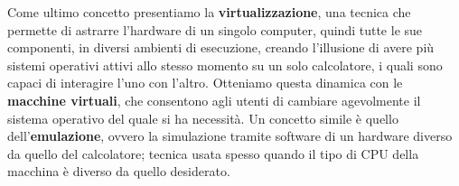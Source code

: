 \noindent Come ultimo concetto presentiamo la \textbf{virtualizzazione}, una tecnica che permette di astrarre l'hardware di un singolo computer, quindi tutte le sue componenti, in diversi ambienti di esecuzione, creando l'illusione di avere più sistemi operativi attivi allo stesso momento su un solo calcolatore, i quali sono capaci di interagire l'uno con l'altro. Otteniamo questa dinamica con le \textbf{macchine virtuali}, che consentono agli utenti di cambiare agevolmente il sistema operativo del quale si ha necessità. Un concetto simile è quello dell'\textbf{emulazione}, ovvero la simulazione tramite software di un hardware diverso da quello del calcolatore; tecnica usata spesso quando il tipo di CPU della macchina è diverso da quello desiderato.
